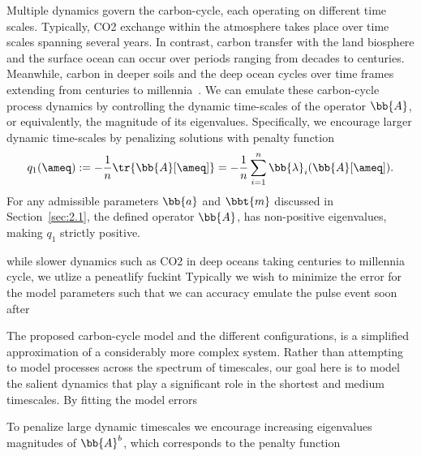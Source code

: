 %
Multiple dynamics govern the carbon-cycle, each operating on different time scales.
%
Typically, CO2 exchange within the atmosphere takes place over time scales spanning several years.
%
In contrast, carbon transfer with the land biosphere and the surface ocean can occur over periods ranging from decades to centuries. 
%
Meanwhile, carbon in deeper soils and the deep ocean cycles over time frames extending from centuries to millennia~\cite{IPCC}.
%
We can emulate these carbon-cycle process dynamics by controlling the dynamic time-scales of the operator $\bb{A}$, or equivalently, the magnitude of its eigenvalues.
%
Specifically, we encourage larger dynamic time-scales by penalizing solutions with penalty function
%
\begin{align}\label{eq:q1}
	q_1(\ameq) := -\frac{1}{n} \tr{\bb{A}[\ameq]} = -\frac{1}{n}\sum_{i=1}^n \bb{\lambda}_i(\bb{A}[\ameq]).
\end{align}
%
For any admissible parameters $\bb{a}$ and $\bbt{m}$ discussed in Section~\ref{sec:2.1}, the defined operator $\bb{A}$, has non-positive eigenvalues, making $q_1$ strictly positive. 





\newpage

 while slower dynamics such as CO2 in deep oceans taking centuries to millennia cycle, we utlize a peneatlify fuckint 
%
Typically we wish to minimize the error for the model parameters such that we can accuracy emulate the pulse event soon after





%
The proposed carbon-cycle model and the different configurations, is a simplified approximation of a considerably more complex system. 
Rather than attempting to model processes across the spectrum of timescales, our goal here is to model the salient dynamics that play a significant role in the shortest and medium timescales. 
%
By fitting the model errors 

To penalize large dynamic timescales we encourage increasing eigenvalues magnitudes of $\bb{A}^b$, which corresponds to the penalty function

